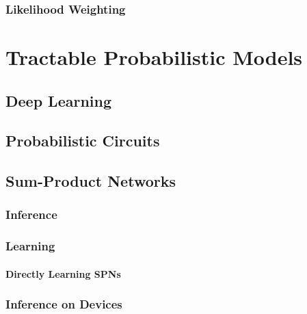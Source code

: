         \subsection{Likelihood Weighting} %

\chapter{Tractable Probabilistic Models} %

    \section{Deep Learning} %

    \section{Probabilistic Circuits} %

    \section{Sum-Product Networks} %

        \subsection{Inference} %

        \subsection{Learning} %

            \subsubsection{Directly Learning SPNs} %

        \subsection{Inference on Devices} %

